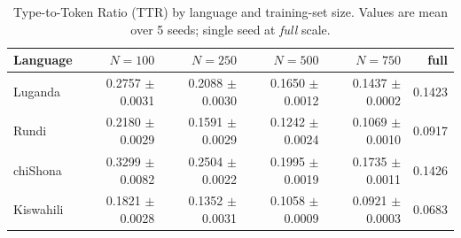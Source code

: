 \begin{table}[t]
\centering
\caption{Type-to-Token Ratio (TTR) by language and training-set size. Values are mean over 5 seeds; single seed at \emph{full} scale.}
\label{tab:ttr}
\begin{tabular}{lrrrrr}
\toprule
\textbf{Language} & $N=100$ & $N=250$ & $N=500$ & $N=750$ & full \\
\midrule
Luganda & 0.2757 {\tiny $\pm$0.0031} & 0.2088 {\tiny $\pm$0.0030} & 0.1650 {\tiny $\pm$0.0012} & 0.1437 {\tiny $\pm$0.0002} & 0.1423 \\
Rundi & 0.2180 {\tiny $\pm$0.0029} & 0.1591 {\tiny $\pm$0.0029} & 0.1242 {\tiny $\pm$0.0024} & 0.1069 {\tiny $\pm$0.0010} & 0.0917 \\
chiShona & 0.3299 {\tiny $\pm$0.0082} & 0.2504 {\tiny $\pm$0.0022} & 0.1995 {\tiny $\pm$0.0019} & 0.1735 {\tiny $\pm$0.0011} & 0.1426 \\
Kiswahili & 0.1821 {\tiny $\pm$0.0028} & 0.1352 {\tiny $\pm$0.0031} & 0.1058 {\tiny $\pm$0.0009} & 0.0921 {\tiny $\pm$0.0003} & 0.0683 \\
\bottomrule
\end{tabular}
\end{table}